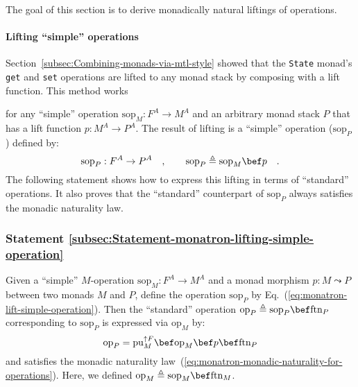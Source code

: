\noindent The goal of this section is to derive monadically natural
liftings of operations.

\paragraph{Lifting \textquotedblleft simple\textquotedblright{} operations}

Section~\ref{subsec:Combining-monads-via-mtl-style} showed that
the \lstinline!State! monad\textsf{'}s \lstinline!get! and \lstinline!set!
operations are lifted to any monad stack by composing with a lift
function. This method works %
\begin{comment}
equally well 
\end{comment}
for any \textsf{``}simple\textsf{''} operation $\text{sop}_{M}:F^{A}\rightarrow M^{A}$
and an arbitrary monad stack $P$ that has a lift function $p:M^{A}\rightarrow P^{A}$.
The result of lifting is a \textsf{``}simple\textsf{''} operation ($\text{sop}_{P}$)
defined by:
\begin{equation}
\text{sop}_{P}:F^{A}\rightarrow P^{A}\quad,\quad\quad\text{sop}_{P}\triangleq\text{sop}_{M}\bef p\quad.\label{eq:monatron-lift-simple-operation}
\end{equation}
The following statement shows how to express this lifting in terms
of \textsf{``}standard\textsf{''} operations. It also proves that the \textsf{``}standard\textsf{''}
counterpart of $\text{sop}_{P}$ always satisfies the monadic naturality
law.

\subsubsection{Statement \label{subsec:Statement-monatron-lifting-simple-operation}\ref{subsec:Statement-monatron-lifting-simple-operation}}

Given a \textsf{``}simple\textsf{''} $M$-operation $\text{sop}_{M}:F^{A}\rightarrow M^{A}$
and a monad morphism $p:M\leadsto P$ between two monads $M$ and
$P$, define the operation $\text{sop}_{P}$ by Eq.~(\ref{eq:monatron-lift-simple-operation}).
Then the \textsf{``}standard\textsf{''} operation $\text{op}_{P}\triangleq\text{sop}_{P}\bef\text{ftn}_{P}$
corresponding to $\text{sop}_{P}$ is expressed via $\text{op}_{M}$
by:
\begin{equation}
\text{op}_{P}=\text{pu}_{M}^{\uparrow F}\bef\text{op}_{M}\bef p\bef\text{ftn}_{P}\label{eq:monatron-lifting-simple-op}
\end{equation}
and satisfies the monadic naturality law~(\ref{eq:monatron-monadic-naturality-for-operations}).
Here, we defined $\text{op}_{M}\triangleq\text{sop}_{M}\bef\text{ftn}_{M}$.

